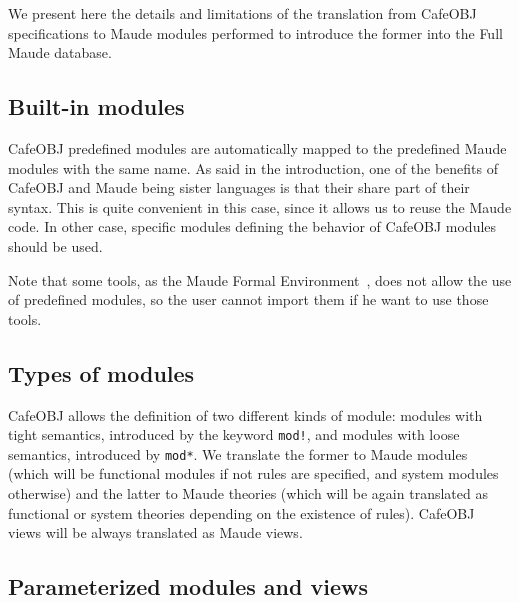 
We present here the details and limitations of the translation from CafeOBJ specifications
to Maude modules performed to introduce the former into the Full Maude database.

\subsection{Built-in modules}

CafeOBJ predefined modules are automatically mapped to the predefined Maude modules with
the same name. As said in the introduction, one of the benefits of CafeOBJ and Maude
being sister languages is that their share part of their syntax. This is quite convenient
in this case, since it allows us to reuse the Maude code. In other case, specific modules
defining the behavior of CafeOBJ modules should be used.

Note that some tools, as the Maude Formal Environment~\cite{mfe11}, does not allow the use
of predefined modules, so the user cannot import them if he want to use those tools.

%

\subsection{Types of modules}

CafeOBJ allows the definition of two different kinds of module: modules with tight semantics,
introduced by the keyword \texttt{mod!}, and modules with loose semantics, introduced by
\texttt{mod*}. We translate the former to Maude modules (which will be functional modules
if not rules are specified, and system modules otherwise) and the latter to Maude theories (which
will be again translated as functional or system theories depending on the existence of rules).
%
CafeOBJ views will be always translated as Maude views.

\subsection{Parameterized modules and views}

